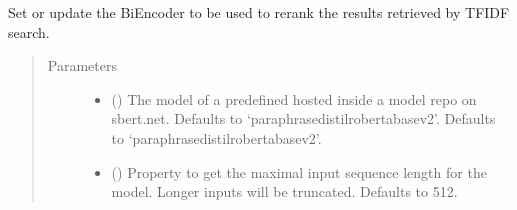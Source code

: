 \documentclass[letterpaper,10pt,english]{sphinxmanual}
\begin{document}
\begin{fulllineitems}
\begin{fulllineitems}
\label{\detokenize{code:lexical_search.TfIdfSearch.setup_biencoder}}
Set or update the Bi\sphinxhyphen{}Encoder to be used to re\sphinxhyphen{}rank the results 
retrieved by TF\sphinxhyphen{}IDF search.
\begin{quote}\begin{description}
\item[{Parameters}] \leavevmode\begin{itemize}
\item {} 
 (\sphinxstyleliteralemphasis{\sphinxupquote{, }}) \textendash{} The model  of a predefined
 hosted inside a model repo on sbert.net. Defaults
to ‘paraphrase\sphinxhyphen{}distilroberta\sphinxhyphen{}base\sphinxhyphen{}v2’. Defaults to ‘paraphrase\sphinxhyphen{}distilroberta\sphinxhyphen{}base\sphinxhyphen{}v2’.

\item {} 
 (\sphinxstyleliteralemphasis{\sphinxupquote{, }}) \textendash{} Property to get the maximal input sequence
length for the model. Longer inputs will be truncated. Defaults to 512.

\end{itemize}

\end{description}\end{quote}

\end{fulllineitems}



\end{fulllineitems}
\end{document}
